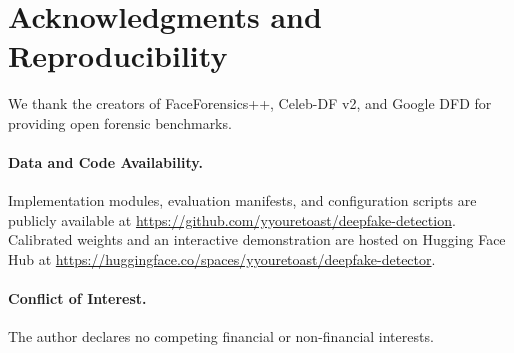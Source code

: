 \documentclass[10pt,twocolumn,letterpaper]{article}
\begin{document}
\section*{Acknowledgments and Reproducibility}
We thank the creators of FaceForensics++, Celeb-DF v2, and Google DFD for providing open forensic benchmarks.

\paragraph{Data and Code Availability.} Implementation modules, evaluation manifests, and configuration scripts are publicly available at \url{https://github.com/yyouretoast/deepfake-detection}. Calibrated weights and an interactive demonstration are hosted on Hugging Face Hub at \url{https://huggingface.co/spaces/yyouretoast/deepfake-detector}.

\paragraph{Conflict of Interest.} The author declares no competing financial or non-financial interests.
\end{document}
